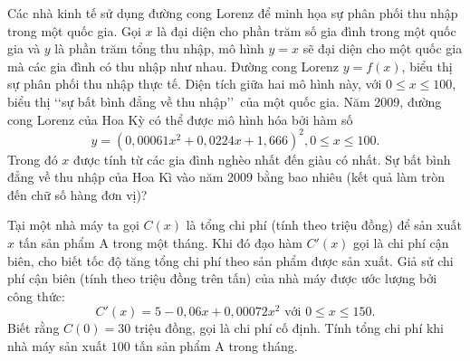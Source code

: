 \begin{bt}%
	Các nhà kinh tế sử dụng đường cong Lorenz để minh họa sự phân phối thu nhập trong một quốc gia. Gọi $x$ là đại diện cho phần trăm số gia đình trong một quốc gia và $y$ là phần trăm tổng thu nhập, mô hình $y=x$ sẽ đại diện cho một quốc gia mà các gia đình có  thu nhập như nhau. Đường cong Lorenz $y=f(x)$, biểu thị sự phân phối thu nhập thực tế. Diện tích giữa hai mô hình này, với $0\leq x\leq 100$, biểu thị \lq\lq sự bất bình đẳng về thu nhập\rq\rq\ của một quốc gia. Năm 2009, đường cong Lorenz của Hoa Kỳ có thể được mô hình hóa bởi hàm số
	\[y=\left(0{,}00061x^2+0{,}0224x+1{,}666\right)^2,0\leq x\leq  100.\]
	Trong đó $x$ được tính  từ các gia đình nghèo nhất đến giàu có nhất. Sự bất bình đẳng về thu nhập của Hoa Kì vào năm 2009 bằng bao nhiêu (kết quả làm tròn đến chữ số hàng đơn vị)?
\end{bt}

\begin{bt}%
	Tại một nhà máy ta gọi $C(x)$ là tổng chi phí (tính theo triệu đồng) để sản xuất $x$ tấn sản phẩm A trong một tháng. Khi đó đạo hàm $C'(x)$ gọi là chi phí cận biên, cho biết tốc độ tăng tổng chi  phí theo sản phẩm được sản xuất. Giả sử chi phí cận biên (tính theo triệu đồng trên tấn) của nhà máy được ước lượng bởi công thức:
	$$ C'(x)=5-0{,}06x+0{,}00072x^2 \text{ với } 0  \le x \le 150. $$
	Biết rằng $C(0)=30$ triệu đồng, gọi là chi phí cố định. Tính tổng chi phí khi nhà máy sản xuất  $100$ tấn sản phẩm A trong tháng.
\end{bt}

